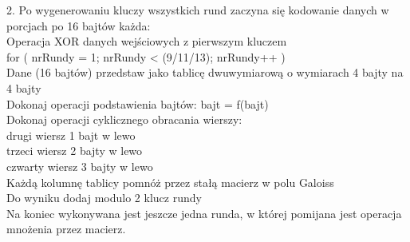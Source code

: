 \documentclass[oneside]{mgr}
\begin{document}
2. Po wygenerowaniu kluczy wszystkich rund zaczyna się kodowanie danych w porcjach po 16 bajtów każda:\\
\hspace*{1 cm}Operacja XOR danych wejściowych z pierwszym kluczem\\
\hspace*{1 cm}for ( nrRundy = 1; nrRundy < (9/11/13); nrRundy++ )\\
\hspace*{2 cm}Dane (16 bajtów) przedstaw jako tablicę dwuwymiarową o wymiarach 4 bajty \hspace*{2 cm}na 4 bajty\\
\hspace*{2 cm}Dokonaj operacji podstawienia bajtów: bajt = f(bajt)\\
\hspace*{2 cm}Dokonaj operacji cyklicznego obracania wierszy:\\
\hspace*{3 cm}drugi wiersz 1 bajt w lewo\\
\hspace*{3 cm}trzeci wiersz 2 bajty w lewo\\
\hspace*{3 cm}czwarty wiersz 3 bajty w lewo\\
\hspace*{2 cm}Każdą kolumnę tablicy pomnóż przez stałą macierz w polu Galoiss\\
\hspace*{2 cm}Do wyniku dodaj modulo 2 klucz rundy\\
Na koniec wykonywana jest jeszcze jedna runda, w której pomijana jest  operacja mnożenia przez macierz.



\end{document}
